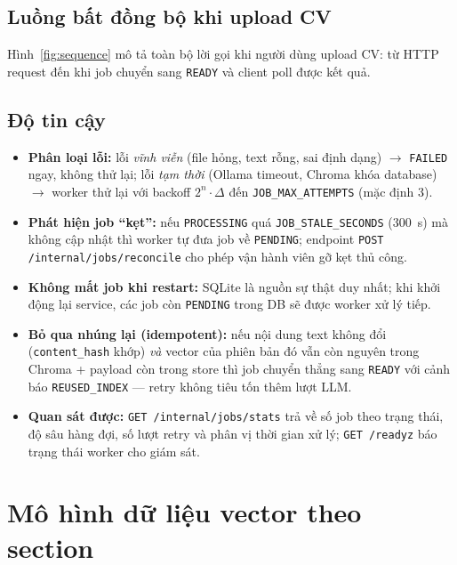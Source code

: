 \documentclass[a4paper,11pt]{article}
\begin{document}
\subsection{Luồng bất đồng bộ khi upload CV}

Hình~\ref{fig:sequence} mô tả toàn bộ lời gọi khi người dùng upload CV: từ HTTP request
đến khi job chuyển sang \texttt{READY} và client poll được kết quả.



\subsection{Độ tin cậy}

\begin{itemize}[leftmargin=1.2em]
  \item \textbf{Phân loại lỗi:} lỗi \emph{vĩnh viễn} (file hỏng, text rỗng, sai định
        dạng) $\to$ \texttt{FAILED} ngay, không thử lại; lỗi \emph{tạm thời} (Ollama
        timeout, Chroma khóa database) $\to$ worker thử lại với backoff
        $2^{n}\cdot\Delta$ đến \texttt{JOB\_MAX\_ATTEMPTS} (mặc định 3).
  \item \textbf{Phát hiện job ``kẹt'':} nếu \texttt{PROCESSING} quá
        \texttt{JOB\_STALE\_SECONDS} (300~s) mà không cập nhật thì worker tự đưa job về
        \texttt{PENDING}; endpoint \texttt{POST /internal/jobs/reconcile} cho phép vận
        hành viên gỡ kẹt thủ công.
  \item \textbf{Không mất job khi restart:} SQLite là nguồn sự thật duy nhất; khi khởi
        động lại service, các job còn \texttt{PENDING} trong DB sẽ được worker xử lý tiếp.
  \item \textbf{Bỏ qua nhúng lại (idempotent):} nếu nội dung text không đổi
        (\texttt{content\_hash} khớp) \emph{và} vector của phiên bản đó vẫn còn nguyên
        trong Chroma + payload còn trong store thì job chuyển thẳng sang \texttt{READY}
        với cảnh báo \texttt{REUSED\_INDEX} --- retry không tiêu tốn thêm lượt LLM.
  \item \textbf{Quan sát được:} \texttt{GET /internal/jobs/stats} trả về số job theo
        trạng thái, độ sâu hàng đợi, số lượt retry và phân vị thời gian xử lý;
        \texttt{GET /readyz} báo trạng thái worker cho giám sát.
\end{itemize}

\section{Mô hình dữ liệu vector theo section}
\end{document}
